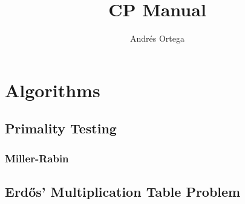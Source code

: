 \documentclass[12pt]{article}
\newcommand{\<}{\langle}
\renewcommand{\>}{\rangle}
\renewcommand{\(}{\left(}
\renewcommand{\)}{\right)}
\begin{document}
\title{CP Manual}
\author{Andrés Ortega}
\date{}

\maketitle


\section{Algorithms}
\subsection{Primality Testing}
\subsubsection{Miller-Rabin}



\subsection{Erdős' Multiplication Table Problem}

\end{document}

